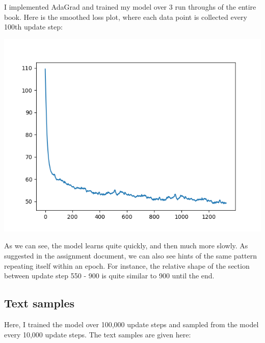 \documentclass[11pt,a4paper]{article}
\begin{document}
I implemented AdaGrad and trained my model over 3 run throughs of the entire book. Here is the smoothed loss plot, where each data point is collected every 100th update step:

\includegraphics[width=\textwidth]{smooth_loss_3_epochs.png}

As we can see, the model learns quite quickly, and then much more slowly. As suggested in the assignment document, we can also see hints of the same pattern repeating itself within an epoch. For instance, the relative shape of the section between update step 550 - 900 is quite similar to 900 until the end.


\subsection{Text samples}

Here, I trained the model over 100,000 update steps and sampled from the model every 10,000 update steps. The text samples are given here:
\end{document}
